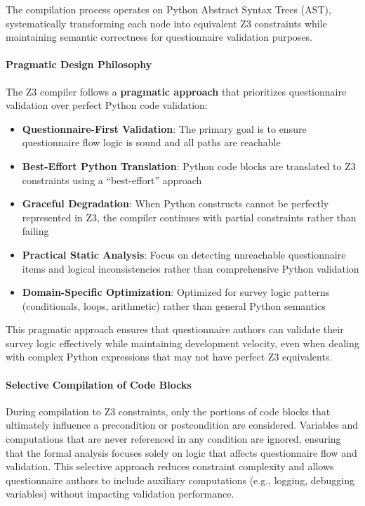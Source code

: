 The compilation process operates on Python Abstract Syntax Trees (AST), systematically transforming each node into equivalent Z3 constraints while maintaining semantic correctness for questionnaire validation purposes.

\paragraph{Pragmatic Design Philosophy}

The Z3 compiler follows a \textbf{pragmatic approach} that prioritizes questionnaire validation over perfect Python code validation:

\begin{itemize}
    \item \textbf{Questionnaire-First Validation}: The primary goal is to ensure questionnaire flow logic is sound and all paths are reachable
    \item \textbf{Best-Effort Python Translation}: Python code blocks are translated to Z3 constraints using a ``best-effort'' approach
    \item \textbf{Graceful Degradation}: When Python constructs cannot be perfectly represented in Z3, the compiler continues with partial constraints rather than failing
    \item \textbf{Practical Static Analysis}: Focus on detecting unreachable questionnaire items and logical inconsistencies rather than comprehensive Python validation
    \item \textbf{Domain-Specific Optimization}: Optimized for survey logic patterns (conditionals, loops, arithmetic) rather than general Python semantics
\end{itemize}

This pragmatic approach ensures that questionnaire authors can validate their survey logic effectively while maintaining development velocity, even when dealing with complex Python expressions that may not have perfect Z3 equivalents.

\paragraph{Selective Compilation of Code Blocks}

During compilation to Z3 constraints, only the portions of code blocks that ultimately influence a precondition or postcondition are considered. Variables and computations that are never referenced in any condition are ignored, ensuring that the formal analysis focuses solely on logic that affects questionnaire flow and validation. This selective approach reduces constraint complexity and allows questionnaire authors to include auxiliary computations (e.g., logging, debugging variables) without impacting validation performance.

